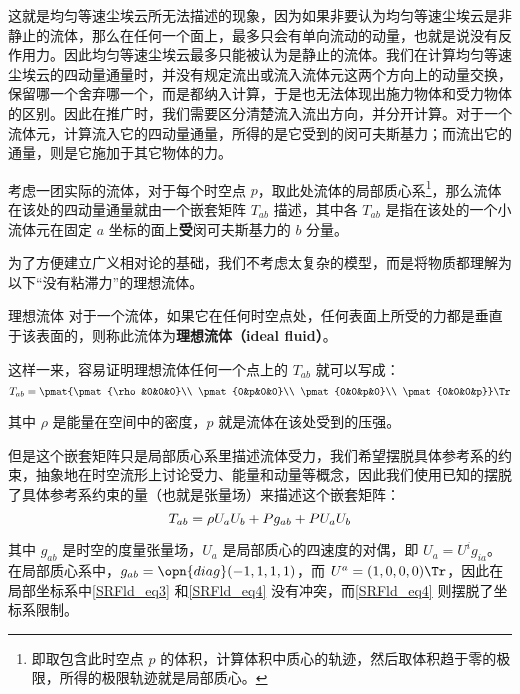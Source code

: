这就是均匀等速尘埃云所无法描述的现象，因为如果非要认为均匀等速尘埃云是非静止的流体，那么在任何一个面上，最多只会有单向流动的动量，也就是说没有反作用力。因此均匀等速尘埃云最多只能被认为是静止的流体。我们在计算均匀等速尘埃云的四动量通量时，并没有规定流出或流入流体元这两个方向上的动量交换，保留哪一个舍弃哪一个，而是都纳入计算，于是也无法体现出施力物体和受力物体的区别。因此在推广时，我们需要区分清楚流入流出方向，并分开计算。对于一个流体元，计算流入它的四动量通量，所得的是它受到的闵可夫斯基力；而流出它的通量，则是它施加于其它物体的力。

\begin{definition}{}
考虑一团实际的流体，对于每个时空点 $p$，取此处流体的局部质心系\footnote{即取包含此时空点 $p$ 的体积，计算体积中质心的轨迹，然后取体积趋于零的极限，所得的极限轨迹就是局部质心。}，那么流体在该处的四动量通量就由一个嵌套矩阵 $T_{ab}$ 描述，其中各 $T_{ab}$ 是指在该处的一个小流体元在固定 $a$ 坐标的面上\textbf{受}闵可夫斯基力的 $b$ 分量。
\end{definition}


为了方便建立广义相对论的基础，我们不考虑太复杂的模型，而是将物质都理解为以下“没有粘滞力”的理想流体。


\begin{definition}{理想流体}
对于一个流体，如果它在任何时空点处，任何表面上所受的力都是垂直于该表面的，则称此流体为\textbf{理想流体（ideal fluid）}。
\end{definition}

这样一来，容易证明理想流体任何一个点上的 $T_{ab}$ 就可以写成：
\begin{equation}\label{SRFld_eq3}
T_{ab}=\pmat{\pmat{\rho&0&0&0}\\
\pmat{0&p&0&0}\\
\pmat{0&0&p&0}\\
\pmat{0&0&0&p}}\Tr
\end{equation}

其中 $\rho$ 是能量在空间中的密度，$p$ 就是流体在该处受到的压强。

但是这个嵌套矩阵只是局部质心系里描述流体受力，我们希望摆脱具体参考系的约束，抽象地在时空流形上讨论受力、能量和动量等概念，因此我们使用已知的摆脱了具体参考系约束的量（也就是张量场）来描述这个嵌套矩阵：
\begin{equation}\label{SRFld_eq4}
T_{ab}=\rho U_aU_b+P g_{ab}+P U_aU_b\\
\end{equation}

其中 $g_{ab}$ 是时空的度量张量场，$U_a$ 是局部质心的四速度的对偶，即 $U_a=U^ig_{ia}$。在局部质心系中，$g_{ab}=\opn{diag}(-1, 1, 1, 1)$，而 $U^{a}=(1, 0, 0 ,0)\Tr$，因此在局部坐标系中\autoref{SRFld_eq3} 和\autoref{SRFld_eq4} 没有冲突，而\autoref{SRFld_eq4} 则摆脱了坐标系限制。

